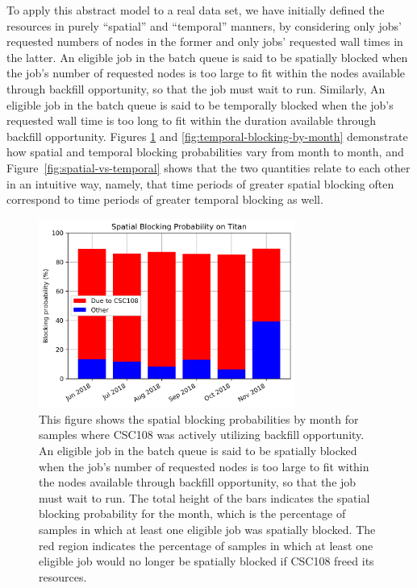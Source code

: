 To apply this abstract model to a real data set, we have initially defined the
resources in purely ``spatial'' and ``temporal'' manners, by considering only
jobs' requested numbers of nodes in the former and only jobs' requested wall
times in the latter. An eligible job in the batch queue is said to be spatially
blocked when the job’s number of requested nodes is too large to fit within the
nodes available through backfill opportunity, so that the job must wait to run.
Similarly, An eligible job in the batch queue is said to be temporally blocked
when the job’s requested wall time is too long to fit within the duration
available through backfill opportunity. Figures
\ref{fig:spatial-blocking-by-month} and \ref{fig:temporal-blocking-by-month}
demonstrate how spatial and temporal blocking probabilities vary from month to
month, and Figure~\ref{fig:spatial-vs-temporal} shows that the two quantities
relate to each other in an intuitive way, namely, that time periods of greater
spatial blocking often correspond to time periods of greater temporal blocking
as well.


\begin{figure}
  \includegraphics[width=0.75\textwidth]{images/barplot-spatial-blocking-by-month.png}
\caption{This figure shows the spatial blocking probabilities by month for
samples where CSC108 was actively utilizing backfill opportunity. An eligible
job in the batch queue is said to be spatially blocked when the job's number of
requested nodes is too large to fit within the nodes available through backfill
opportunity, so that the job must wait to run. The total height of the bars
indicates the spatial blocking probability for the month, which is the
percentage of samples in which at least one eligible job was spatially blocked.
The red region indicates the percentage of samples in which at least one
eligible job would no longer be spatially blocked if CSC108 freed its
resources.}
\label{fig:spatial-blocking-by-month}
\end{figure}


